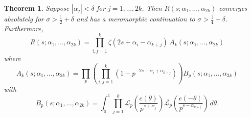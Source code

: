 \documentclass[12pt,letterpaper]{amsart}
\theoremstyle{plain}
\newtheorem{theorem}{Theorem}[section]
\theoremstyle{definition}
\theoremstyle{remark}
\numberwithin{equation}{subsection}
\numberwithin{theorem}{subsection}
\numberwithin{table}{subsection}
\def\({\left(}
\def\){\right)}
\begin{document}
\begin{theorem} \label{thm:Rkgeneral}
Suppose $|\alpha_j|<\delta$ for $j=1,\dots,2k$.  Then
$R(s;\alpha_1,\dots,\alpha_{2k})$ converges absolutely for
$\sigma>\frac12 + \delta$ and has a meromorphic continuation
to $\sigma>\frac14 + \delta$.  Furthermore,
\begin{equation}
 R(s;\alpha_1,\dots,\alpha_{2k})  = 
\prod_{i,j=1}^k\zeta(2s+\alpha_i-\alpha_{k+j})
\,A_k(s;\alpha_1,\dots,\alpha_{2k})
\end{equation}
where 
\begin{equation} \label{eqn:bigAk}
A_k(s;\alpha_1,\dots,\alpha_{2k})=\prod_p 
\(
\prod_{i,j=1}^k
(1-p^{-2s-\alpha_i+\alpha_{k+j}})
\)
B_p(s;\alpha_1,\dots,\alpha_{2k}) 
\end{equation}
with
\begin{equation}  \label{eqn:bigBk} 
B_p(s;\alpha_1,\dots,\alpha_{2k}) =
\int_0^1 \prod_{j=1}^k
\mathcal{L}_p\left(\frac{e(\theta)}{p^{s+\alpha_j}}\right)
\overline{\mathcal{L}_p}\left(\frac{e(-\theta)}{p^{s-\alpha_{k+j}}}\right)
\,d\theta.
\end{equation}
\end{theorem}
\end{document}
